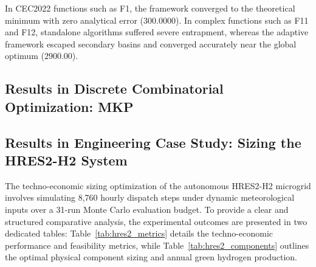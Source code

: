 In CEC2022 functions such as F1, the framework converged to the theoretical minimum with zero analytical error ($300.0000$). In complex functions such as F11 and F12, standalone algorithms suffered severe entrapment, whereas the adaptive framework escaped secondary basins and converged accurately near the global optimum ($2900.00$).

\subsection{Results in Discrete Combinatorial Optimization: MKP}
\label{sec:results_mkp}


\subsection{Results in Engineering Case Study: Sizing the HRES2-H2 System}
\label{sec:results_hres2}

The techno-economic sizing optimization of the autonomous HRES2-H2 microgrid involves simulating 8,760 hourly dispatch steps under dynamic meteorological inputs over a 31-run Monte Carlo evaluation budget. To provide a clear and structured comparative analysis, the experimental outcomes are presented in two dedicated tables: Table~\ref{tab:hres2_metrics} details the techno-economic performance and feasibility metrics, while Table~\ref{tab:hres2_components} outlines the optimal physical component sizing and annual green hydrogen production.

